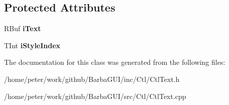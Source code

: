 \subsection*{Protected Attributes}
\begin{DoxyCompactItemize}
\item 
\mbox{\label{classCCtlText_a3c031dd75b9448dee44a671349a6a175}} 
R\+Buf {\bfseries i\+Text}
\item 
\mbox{\label{classCCtlText_a1840cfe7b9336e46c69ee0a7b330fd79}} 
T\+Int {\bfseries i\+Style\+Index}
\end{DoxyCompactItemize}


The documentation for this class was generated from the following files\+:\begin{DoxyCompactItemize}
\item 
/home/peter/work/github/\+Barba\+G\+U\+I/inc/\+Ctl/Ctl\+Text.\+h\item 
/home/peter/work/github/\+Barba\+G\+U\+I/src/\+Ctl/Ctl\+Text.\+cpp\end{DoxyCompactItemize}
